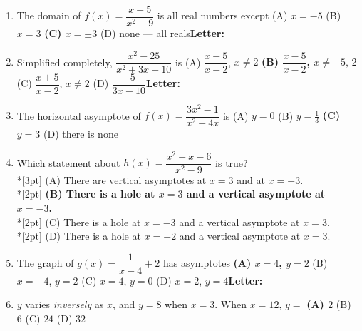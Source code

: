 \documentclass[10pt]{article}
\begin{document}
\begin{enumerate}[leftmargin=1.9em, itemsep=9pt]
  \item The domain of $f(x)=\dfrac{x+5}{x^2-9}$ is all real numbers except
    \hfill (A) $x=-5$ \quad (B) $x=3$ \quad \textbf{(C) $x=\pm 3$} \ans{$\leftarrow$} \quad (D) none --- all reals\nobreak\hfill\mbox{\small\textbf{Letter:}\ \choicebox{\gradedblank[id=qb1, type=choice, points=2, answer={C}]{0.4in}{10pt}}}
  \item Simplified completely, $\dfrac{x^2-25}{x^2+3x-10}$ is
    \hfill (A) $\dfrac{x-5}{x-2}$, $x\ne 2$ \quad \textbf{(B) $\dfrac{x-5}{x-2}$, $x\ne -5,\,2$} \ans{$\leftarrow$} \quad (C) $\dfrac{x+5}{x-2}$, $x\ne 2$ \quad (D) $\dfrac{-5}{3x-10}$\nobreak\hfill\mbox{\small\textbf{Letter:}\ \choicebox{\gradedblank[id=qb2, type=choice, points=2, answer={B}]{0.4in}{10pt}}}
  \item The horizontal asymptote of $f(x)=\dfrac{3x^2-1}{x^2+4x}$ is
    \hfill \llap{\choicebox{\gradedblank[id=qb3, type=choice, points=2, answer={C}]{0.2in}{10pt}}\,}(A) $y=0$ \quad (B) $y=\frac13$ \quad \textbf{(C) $y=3$} \ans{$\leftarrow$} \quad (D) there is none
  \item {}Which statement about $h(x)=\dfrac{x^2-x-6}{x^2-9}$ is true?
    \\*[3pt]\hspace*{1.2em} (A) There are vertical asymptotes at $x=3$ and at $x=-3$.
    \\*[2pt]\hspace*{1.2em} \textbf{(B) There is a hole at $x=3$ and a vertical asymptote at $x=-3$.} \ans{$\leftarrow$}
    \\*[2pt]\hspace*{1.2em} (C) There is a hole at $x=-3$ and a vertical asymptote at $x=3$.
    \\*[2pt]\hspace*{1.2em} (D) There is a hole at $x=-2$ and a vertical asymptote at $x=3$.
  \item The graph of $g(x)=\dfrac{1}{x-4}+2$ has asymptotes
    \hfill \textbf{(A) $x=4$, $y=2$} \ans{$\leftarrow$} \quad (B) $x=-4$, $y=2$ \quad (C) $x=4$, $y=0$ \quad (D) $x=2$, $y=4$\nobreak\hfill\mbox{\small\textbf{Letter:}\ \choicebox{\gradedblank[id=qb5, type=choice, points=2, answer={A}]{0.4in}{10pt}}}
  \item $y$ varies \emph{inversely} as $x$, and $y=8$ when $x=3$. When $x=12$, $y=$
    \hfill \llap{\choicebox{\gradedblank[id=qb6, type=choice, points=2, answer={A}]{0.35in}{10pt}}\enspace}\textbf{(A) $2$} \ans{$\leftarrow$} \quad (B) $6$ \quad (C) $24$ \quad (D) $32$
\end{enumerate}
\end{document}
